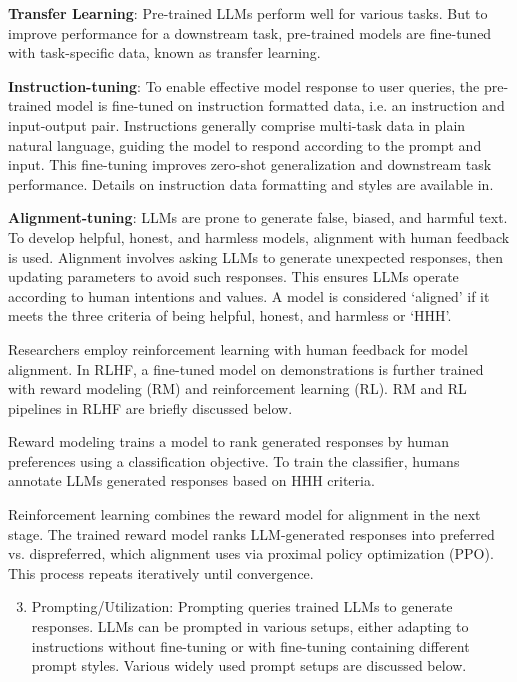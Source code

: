 \documentclass[a4paper,oneside]{book}
\begin{document}
\textbf{Transfer Learning}: Pre-trained LLMs perform well for various tasks. But to improve performance for a downstream task, pre-trained models are fine-tuned with task-specific data, known as transfer learning.

\textbf{Instruction-tuning}: To enable effective model response to user queries, the pre-trained model is fine-tuned on instruction formatted data, i.e. an instruction and input-output pair. Instructions generally comprise multi-task data in plain natural language, guiding the model to respond according to the prompt and input. This fine-tuning improves zero-shot generalization and downstream task performance. Details on instruction data formatting and styles are available in.

\textbf{Alignment-tuning}: LLMs are prone to generate false, biased, and harmful text. To develop helpful, honest, and harmless models, alignment with human feedback is used. Alignment involves asking LLMs to generate unexpected responses, then updating parameters to avoid such responses. This ensures LLMs operate according to human intentions and values. A model is considered `aligned' if it meets the three criteria of being helpful, honest, and harmless or `HHH'.

Researchers employ reinforcement learning with human feedback for model alignment. In RLHF, a fine-tuned model on demonstrations is further trained with reward modeling (RM) and reinforcement learning (RL). RM and RL pipelines in RLHF are briefly discussed below.

Reward modeling trains a model to rank generated responses by human preferences using a classification objective. To train the classifier, humans annotate LLMs generated responses based on HHH criteria.

Reinforcement learning combines the reward model for alignment in the next stage. The trained reward model ranks LLM-generated responses into preferred vs. dispreferred, which alignment uses via proximal policy optimization (PPO). This process repeats iteratively until convergence.

\begin{enumerate}
  \setcounter{enumi}{2}
  \item Prompting/Utilization: Prompting queries trained LLMs to generate responses. LLMs can be prompted in various setups, either adapting to instructions without fine-tuning or with fine-tuning containing different prompt styles. Various widely used prompt setups are discussed below.
\end{enumerate}
\end{document}
